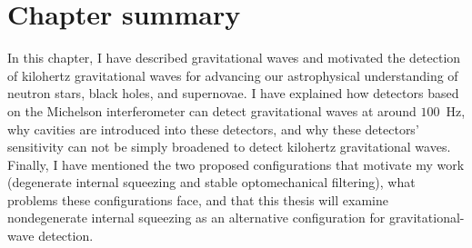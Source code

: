 

\section{Chapter summary}


In this chapter, I have described gravitational waves and motivated the detection of kilohertz gravitational waves for advancing our astrophysical understanding of neutron stars, black holes, and supernovae. I have explained how detectors based on the Michelson interferometer can detect gravitational waves at around $100$~Hz, why cavities are introduced into these detectors, and why these detectors' sensitivity can not be simply broadened to detect kilohertz gravitational waves. Finally, I have mentioned the two proposed configurations that motivate my work (degenerate internal squeezing and stable optomechanical filtering), what problems these configurations face, and that this thesis will examine nondegenerate internal squeezing as an alternative configuration for gravitational-wave detection.


